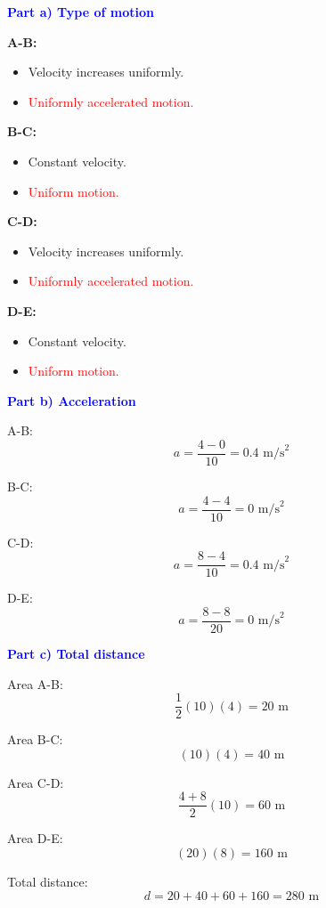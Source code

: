 \begin{exercise}
\begin{solu}
    \textbf{\textcolor{blue}{Part a) Type of motion}}

    \textbf{A-B:}
    \begin{itemize}
        \item Velocity increases uniformly.
        \item \textcolor{red}{Uniformly accelerated motion.}
    \end{itemize}

    \textbf{B-C:}
    \begin{itemize}
        \item Constant velocity.
        \item \textcolor{red}{Uniform motion.}
    \end{itemize}

    \textbf{C-D:}
    \begin{itemize}
        \item Velocity increases uniformly.
        \item \textcolor{red}{Uniformly accelerated motion.}
    \end{itemize}

    \textbf{D-E:}
    \begin{itemize}
        \item Constant velocity.
        \item \textcolor{red}{Uniform motion.}
    \end{itemize}

    \textbf{\textcolor{blue}{Part b) Acceleration}}

    A-B:
    \[
    a=\frac{4-0}{10}=0.4\text{ m/s}^2
    \]

    B-C:
    \[
    a=\frac{4-4}{10}=0\text{ m/s}^2
    \]

    C-D:
    \[
    a=\frac{8-4}{10}=0.4\text{ m/s}^2
    \]

    D-E:
    \[
    a=\frac{8-8}{20}=0\text{ m/s}^2
    \]

    \textbf{\textcolor{blue}{Part c) Total distance}}

    Area A-B:
    \[
    \frac12(10)(4)=20\text{ m}
    \]

    Area B-C:
    \[
    (10)(4)=40\text{ m}
    \]

    Area C-D:
    \[
    \frac{4+8}{2}(10)=60\text{ m}
    \]

    Area D-E:
    \[
    (20)(8)=160\text{ m}
    \]

    Total distance:
    \[
    d=20+40+60+160=\boxed{280\text{ m}}
    \]

    \end{solu}
\end{exercise}

